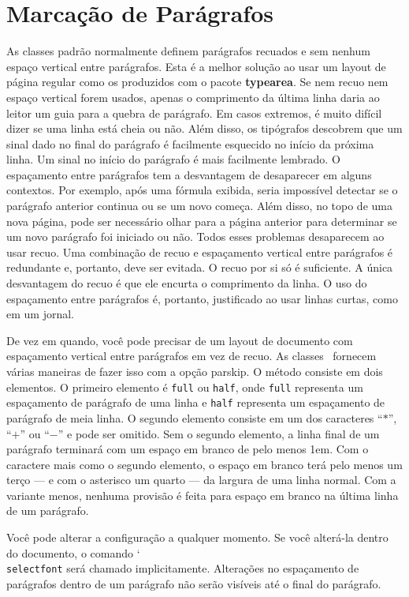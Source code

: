 \chapter{Marcação de Parágrafos}
As classes padrão normalmente definem parágrafos recuados e sem nenhum espaço vertical entre parágrafos. Esta é a melhor solução ao usar um layout de página regular como os produzidos com o pacote \textbf{typearea}. Se nem recuo nem espaço vertical forem usados, apenas o comprimento da última linha daria ao leitor um guia para a quebra de parágrafo. Em casos extremos, é muito difícil dizer se uma linha está cheia ou não. Além disso, os tipógrafos descobrem que um sinal dado no final do parágrafo é facilmente esquecido no início da próxima linha. Um sinal no início do parágrafo é mais facilmente lembrado. O espaçamento entre parágrafos tem a desvantagem de desaparecer em alguns contextos. Por exemplo, após uma fórmula exibida, seria impossível detectar se o parágrafo anterior continua ou se um novo começa. Além disso, no topo de uma nova página, pode ser necessário olhar para a página anterior para determinar se um novo parágrafo foi iniciado ou não. Todos esses problemas desaparecem ao usar recuo. Uma combinação de recuo e espaçamento vertical entre parágrafos é redundante e, portanto, deve ser evitada. O recuo por si só é suficiente. A única desvantagem do recuo é que ele encurta o comprimento da linha. O uso do espaçamento entre parágrafos é, portanto, justificado ao usar linhas curtas, como em um jornal.

De vez em quando, você pode precisar de um layout de documento com espaçamento vertical entre parágrafos em vez de recuo. As classes \KOMAScript\ fornecem várias maneiras de fazer isso com a opção parskip. O método consiste em dois elementos. O primeiro elemento é \texttt{full} ou \texttt{half}, onde \texttt{full} representa um espaçamento de parágrafo de uma linha e \texttt{half} representa um espaçamento de parágrafo de meia linha. O segundo elemento consiste em um dos caracteres ``$\ast$'', ``$+$'' ou ``$-$'' e pode ser omitido. Sem o segundo elemento, a linha final de um parágrafo terminará com um espaço em branco de pelo menos 1em. Com o caractere mais como o segundo elemento, o espaço em branco terá pelo menos um terço --- e com o asterisco um quarto --- da largura de uma linha normal. Com a variante menos, nenhuma provisão é feita para espaço em branco na última linha de um parágrafo.

Você pode alterar a configuração a qualquer momento. Se você alterá-la dentro do documento, o comando \char`\\\texttt{se\-lect\-font} será chamado implicitamente. Alterações no espaçamento de parágrafos dentro de um parágrafo não serão visíveis até o final do parágrafo.


